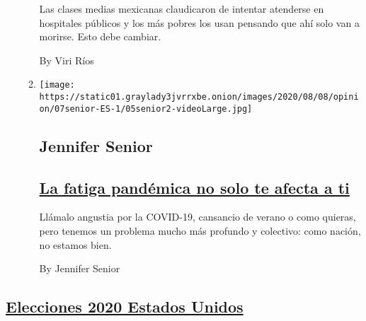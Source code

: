 \begin{enumerate}
\begin{enumerate}
    Las clases medias mexicanas claudicaron de intentar atenderse en
    hospitales públicos y los más pobres los usan pensando que ahí solo
    van a morirse. Esto debe cambiar.

    By Viri Ríos
  \item
    \texttt{[image: https://static01.graylady3jvrrxbe.onion/images/2020/08/08/opinion/07senior-ES-1/05senior2-videoLarge.jpg]}

    \hypertarget{jennifer-senior}{%
    \subsection{Jennifer Senior}\label{jennifer-senior}}

    \hypertarget{la-fatiga-panduxe9mica-no-solo-te-afecta-a-ti}{%
    \subsection{\texorpdfstring{\href{/es/2020/08/07/espanol/opinion/ansiedad-coronavirus.html}{La
    fatiga pandémica no solo te afecta a
    ti}}{La fatiga pandémica no solo te afecta a ti}}\label{la-fatiga-panduxe9mica-no-solo-te-afecta-a-ti}}

    Llámalo angustia por la COVID-19, cansancio de verano o como
    quieras, pero tenemos un problema mucho más profundo y colectivo:
    como nación, no estamos bien.

    By Jennifer Senior
  \end{enumerate}
\end{enumerate}

\hypertarget{elecciones-2020-estados-unidos}{%
\subsection{\texorpdfstring{\protect\hyperlink{}{Elecciones 2020 Estados
Unidos}}{Elecciones 2020 Estados Unidos}}\label{elecciones-2020-estados-unidos}}

